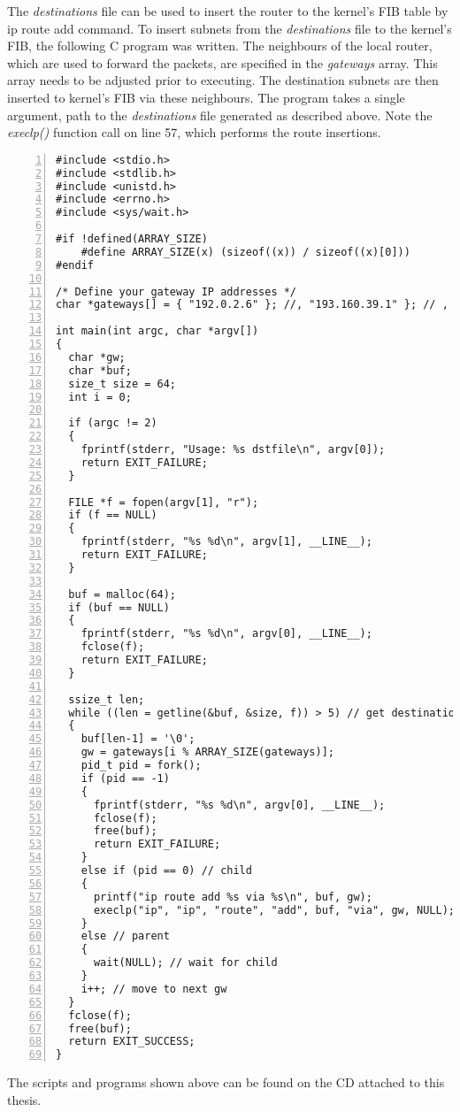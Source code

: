 The {\it{destinations}} file can be used to insert the router to the kernel's FIB table by ip route add command.
To insert subnets from the {\it{destinations}} file to the kernel's FIB, the following C program was written.
The neighbours of the local router, which are used to forward the packets, are specified in the {\it{gateways}} array.
This array needs to be adjusted prior to executing.
The destination subnets are then inserted to kernel's FIB via these neighbours.
The program takes a single argument, path to the {\it{destinations}} file generated as described above.
Note the {\it{execlp()}} function call on line 57, which performs the route insertions.
\begin{lstlisting}[numbers=left]
#include <stdio.h>
#include <stdlib.h>
#include <unistd.h>
#include <errno.h>
#include <sys/wait.h>

#if !defined(ARRAY_SIZE)
    #define ARRAY_SIZE(x) (sizeof((x)) / sizeof((x)[0]))
#endif

/* Define your gateway IP addresses */
char *gateways[] = { "192.0.2.6" }; //, "193.160.39.1" }; // , etc. };

int main(int argc, char *argv[])
{
  char *gw;
  char *buf;
  size_t size = 64;
  int i = 0;

  if (argc != 2)
  {
    fprintf(stderr, "Usage: %s dstfile\n", argv[0]);
    return EXIT_FAILURE;
  }

  FILE *f = fopen(argv[1], "r");
  if (f == NULL)
  {
    fprintf(stderr, "%s %d\n", argv[1], __LINE__);
    return EXIT_FAILURE;
  }

  buf = malloc(64);
  if (buf == NULL)
  {
    fprintf(stderr, "%s %d\n", argv[0], __LINE__);
    fclose(f);
    return EXIT_FAILURE;
  }

  ssize_t len;
  while ((len = getline(&buf, &size, f)) > 5) // get destination subnets
  {
    buf[len-1] = '\0';
    gw = gateways[i % ARRAY_SIZE(gateways)];
    pid_t pid = fork();
    if (pid == -1)
    {
      fprintf(stderr, "%s %d\n", argv[0], __LINE__);
      fclose(f);
      free(buf);
      return EXIT_FAILURE;
    }
    else if (pid == 0) // child
    {
      printf("ip route add %s via %s\n", buf, gw);
      execlp("ip", "ip", "route", "add", buf, "via", gw, NULL);
    }
    else // parent
    {
      wait(NULL); // wait for child
    }
    i++; // move to next gw
  }
  fclose(f);
  free(buf);
  return EXIT_SUCCESS;
}
\end{lstlisting}

The scripts and programs shown above can be found on the CD attached to this thesis.

